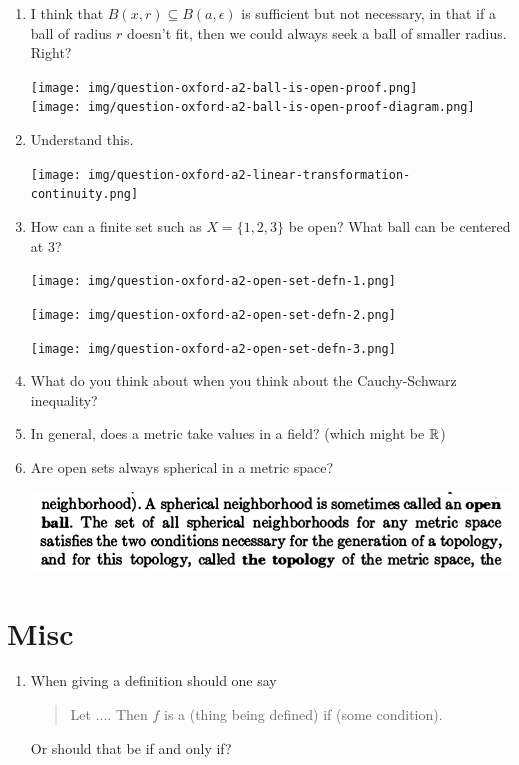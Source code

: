 \documentclass[12pt]{article}
\begin{document}
\begin{enumerate}
\item I think that $B(x, r) \subseteq B(a, \epsilon)$ is sufficient but not necessary, in that if a
  ball of radius $r$ doesn't fit, then we could always seek a ball of smaller radius. Right?
  \begin{mdframed}
    \texttt{[image: img/question-oxford-a2-ball-is-open-proof.png]}\\
    \texttt{[image: img/question-oxford-a2-ball-is-open-proof-diagram.png]}
  \end{mdframed}
\item Understand this.
  \begin{mdframed}
    \texttt{[image: img/question-oxford-a2-linear-transformation-continuity.png]}
  \end{mdframed}
\newpage
\item How can a finite set such as $X = \{1, 2, 3\}$ be open? What ball can be centered at 3?
  \begin{mdframed}
    \texttt{[image: img/question-oxford-a2-open-set-defn-1.png]}
  \end{mdframed}
  \begin{mdframed}
    \texttt{[image: img/question-oxford-a2-open-set-defn-2.png]}
  \end{mdframed}
  \begin{mdframed}
    \texttt{[image: img/question-oxford-a2-open-set-defn-3.png]}
  \end{mdframed}
\item What do you think about when you think about the Cauchy-Schwarz inequality?
\item In general, does a metric take values in a field? (which might be $\mathbb{R}$)
\item Are open sets always spherical in a metric space?
  \begin{mdframed}
    \includegraphics[width=400pt]{img/questions-metric-space-open-sets-gelbaum.png}
  \end{mdframed}
\end{enumerate}

\section{Misc}
\begin{enumerate}
\item When giving a definition should one say
  \begin{quote}
    Let .... Then $f$ is a (thing being defined) if (some condition).
  \end{quote}
  Or should that be if and only if?
\end{enumerate}
\end{document}
